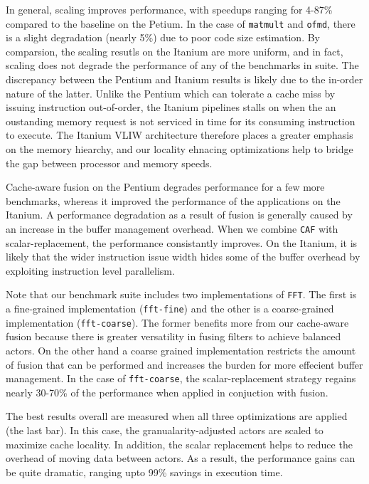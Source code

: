 In general, scaling improves performance, with speedups ranging for
4-87\% compared to the baseline on the Petium. In the case of
\texttt{matmult} and \texttt{ofmd}, there is a slight degradation
(nearly 5\%) due to poor code size estimation. By comparsion, the
scaling resutls on the 
Itanium are more uniform, and in fact, scaling does not degrade the
performance of any of the benchmarks in suite. The discrepancy between
the Pentium and Itanium results is likely due to the in-order
nature of the latter. Unlike the Pentium which can tolerate a cache
miss by issuing instruction out-of-order, the Itanium pipelines stalls
on when the an oustanding memory request is not serviced in time for
its consuming instruction to execute. The Itanium VLIW architecture
therefore places a greater emphasis on the memory hiearchy, and our
locality ehnacing optimizations help to bridge the gap between
processor and memory speeds.

Cache-aware fusion on the Pentium degrades performance for a few more benchmarks,
whereas it improved the performance of the applications on the Itanium.
A performance degradation as a result of fusion is generally caused by
an increase in the buffer management overhead. When
we combine \texttt{CAF} with scalar-replacement, the
performance consistantly improves. On the Itanium, it is likely that
the wider instruction issue width hides some of the buffer overhead by
exploiting instruction level parallelism.

Note that our benchmark suite
includes two implementations of \texttt{FFT}. The first is a
fine-grained implementation (\texttt{fft-fine}) and the other is a
coarse-grained implementation (\texttt{fft-coarse}). The former
benefits more from our cache-aware fusion because there is greater
versatility in fusing filters to achieve balanced actors. On the other hand
a coarse grained implementation restricts the amount of fusion that
can be performed and increases the burden for more effecient buffer
management. In the case of \texttt{fft-coarse}, the scalar-replacement
strategy regains nearly 30-70\% of the performance when applied in
conjuction with fusion.

The best results overall are measured when all three optimizations are
applied (the last bar). In this case, the granualarity-adjusted actors
are scaled to maximize cache locality. In addition, the scalar replacement
helps to reduce the overhead of moving data
between actors. As a result, the performance gains can be quite
dramatic, ranging upto 99\% savings in execution time.

